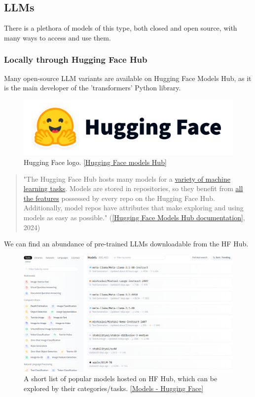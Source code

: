 \subsection{LLMs}
There is a plethora of models of this type, both closed and open source, with many ways to access and use them.
\subsubsection*{Locally through Hugging Face Hub}
Many open-source LLM variants are available on Hugging Face Models Hub, as it is the main developer of the 'transformers' Python library.
\begin{figure}[htbp]
    \centering
    \includegraphics[width=0.4\linewidth]{./figures/hf-logo.png}
    \caption{Hugging Face logo. \href{https://huggingface.co/models}{[Hugging Face models Hub]}}
\end{figure}
\begin{quote}
    "The Hugging Face Hub hosts many models for a \href{https://huggingface.co/tasks}{variety of machine learning tasks}. Models are stored in repositories, so they benefit from \href{https://huggingface.co/docs/hub/repositories}{all the features} possessed by every repo on the Hugging Face Hub. Additionally, model repos have attributes that make exploring and using models as easy as possible."  (\href{https://huggingface.co/docs/hub/models}{[Hugging Face Models Hub documentation]}, 2024)
\end{quote}
We can find an abundance of pre-trained LLMs downloadable from the HF Hub.
\begin{figure}[htbp]
    \centering
    \includegraphics[width=.85\linewidth]{./figures/hf-models.png}
    \caption{A short list of popular models hosted on HF Hub, which can be explored by their categories/tasks. \href{https://huggingface.co/models}{[Models - Hugging Face]}}
\end{figure}\newline
